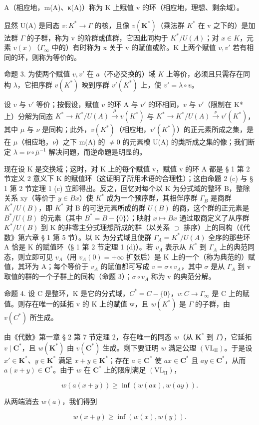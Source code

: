 A（相应地，m(A)、κ(A)）称为 K 上赋值 v 的环（相应地，理想、剩余域）。

显然 U(A) 是同态 \(v: K^{*} \to \Gamma\) 的核，且像 \(v(\mathbf{K}^{*})\)（乘法群 \(K^{*}\) 在 v 之下的）是加法群 \(\Gamma\) 的子群，称为 v 的阶群或值群，它因此同构于 \(K^{*}/U(A)\)；对 \(x \in K\)，元素 \(v(x)\)（\(\Gamma_{\infty}\) 中的）有时称为 x 关于 v 的赋值或阶。K 上两个赋值 \(v, v'\) 若有相同的环，则称为等价的。

命题 3. 为使两个赋值 \(v, v'\) 在 \(a\)（不必交换的）域 \(K\) 上等价，必须且只需存在同构 \(\lambda\)，它把序群 \(v(K^*)\) 映到序群 \(v'(K^*)\) 上，使 \(v' = \lambda \circ v\)。

设 \(v\) 与 \(v'\) 等价；按假设，赋值 \(v\) 的环 A 与 \(v'\) 的环相同，\(v\) 与 \(v'\)（限制在 K* 上）分解为同态 \(K^* \to K^*/U(A) \xrightarrow{\mu} v(K^*)\) 与 \(K^* \to K^*/U(A) \xrightarrow{\nu} v'(K^*)\)，其中 \(\mu\) 与 \(\nu\) 是同构；此外，\(v(K^*)\)（相应地，\(v'(K^*)\)）的正元素所成之集，是在 \(\mu\)（相应地，\(\nu\)）之下 m(A) 的 \(\neq 0\) 的元素模 U(A) 的类所成之集的像；我们断定 \(\lambda = \nu \circ \overline{\mu}^{-1}\) 解决问题，而逆命题是明显的。

现在设 K 是交换域；这时，对 K 上的每个赋值 v，赋值 v 的环 A 都是 § 1 第 2 节定义 2 意义下 K 的赋值环（这证明了所用术语的合理性）；这由命题 2 (c) 与 § 1 第 2 节定理 1 (c) 立即得出。反之，回忆对每个以 K 为分式域的整环 B，整除关系 x\textbar y（等价于 \(y \in Bx\)）使 \(K^{*}\) 成为一个预序群，其相伴序群 \(\Gamma_{B}\) 是商群 \(K^{*}/U(B)\)，即 \(K^{*}\) 对 B 的可逆元素所成的群 \(U(B)\) 的商，这个群的正元素是 \(B^{*}/U(B)\) 的元素（其中 \(B^{*} = B - \{0\}\)）；映射 \(x \mapsto Bx\) 通过取商定义了从序群 \(K^{*}/U(B)\) 到 K 的非零主分式理想所成的群（以关系 \(\supset\) 排序）上的同构（《代数》第六章 § 1 第 5 节）。以 K 为分式域且使群 \(\Gamma_{A} = K^{*}/U(A)\) 全序的那些环 A 恰是 K 的赋值环（§ 1 第 2 节定理 1 (d)）。若 \(v_{A}\) 表示从 \(K^{*}\) 到 \(\Gamma_{A}\) 上的典范同态，则立即可见 \(v_{A}\)（用 \(v_{A}(0) = +\infty\) 扩张后）是 K 上的一个（称为典范的）赋值，其环为 A；每个等价于 \(v_{A}\) 的赋值都可写成 \(v = \sigma \circ v_{A}\)，其中 \(\sigma\) 是从 \(\Gamma_{A}\) 到 v 取值的群的一个子群上的同构（命题 3）；\(\sigma \circ v_{A}\) 称为 v 的典范分解。

命题 4. 设 C 是整环，K 是它的分式域，\(C^{*} = C - \{0\}\)，\(v: C \to \Gamma_{\infty}\) 是 C 上的赋值。则存在唯一的延拓 v 的 K 上的赋值 w，且 \(w(K^{*})\) 是 \(\Gamma\) 的子群，由 \(v(C^{*})\) 所生成。

由《代数》第一章 § 2 第 7 节定理 2，存在唯一的同态 \(w\)（从 \(\mathbf{K}^*\) 到 \(\Gamma\)），它延拓 \(v \mid \mathbf{C}^*\)，且 \(w(\mathbf{K}^*)\) 由 \(v(\mathbf{C}^*)\) 生成。剩下要证明 \(w\) 满足公理 \((\mathrm{VL}_{\mathrm{II}})\)。于是设 \(x' \in \mathbf{K}^*\)、\(y \in \mathbf{K}^*\) 满足 \(x + y \in \mathbf{K}^*\)；存在 \(a \in \mathbf{C}^*\) 使 \(ax \in \mathbf{C}^*\) 且 \(ay \in \mathbf{C}^*\)，从而 \(a(x + y) \in \mathbf{C}^*\)。由于 \(w\) 在 \(\mathbf{C}^*\) 上的限制满足 \((\mathrm{VL}_{\mathrm{II}})\)，

\[
w (a (x + y)) \geqslant \inf (w (a x), w (a y)).
\]

从两端消去 \(w(a)\)，我们得到

\[
w (x + y) \geqslant \inf (w (x), w (y)).
\]

